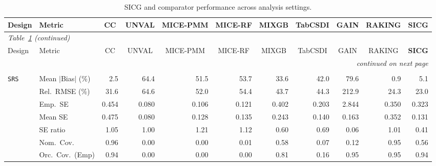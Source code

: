 \begin{landscape}
\footnotesize\setlength{\tabcolsep}{3.5pt}
\begin{longtable}{llrrrrrrrrr}
\caption{SICG and comparator performance across analysis settings.}
\label{tab:appc_nutri_Binomial} \\
\toprule
Design & Metric & \multicolumn{1}{c}{CC} & \multicolumn{1}{c}{UNVAL} & \multicolumn{1}{c}{MICE-PMM} & \multicolumn{1}{c}{MICE-RF} & \multicolumn{1}{c}{MIXGB} & \multicolumn{1}{c}{TabCSDI} & \multicolumn{1}{c}{GAIN} & \multicolumn{1}{c}{RAKING} & \multicolumn{1}{c}{\textbf{SICG}} \\
\midrule \endfirsthead
\multicolumn{11}{l}{\footnotesize\itshape Table~\ref{tab:appc_nutri_Binomial} (continued)} \\
\toprule
Design & Metric & \multicolumn{1}{c}{CC} & \multicolumn{1}{c}{UNVAL} & \multicolumn{1}{c}{MICE-PMM} & \multicolumn{1}{c}{MICE-RF} & \multicolumn{1}{c}{MIXGB} & \multicolumn{1}{c}{TabCSDI} & \multicolumn{1}{c}{GAIN} & \multicolumn{1}{c}{RAKING} & \multicolumn{1}{c}{\textbf{SICG}} \\
\midrule \endhead
\midrule \multicolumn{11}{r}{\footnotesize\itshape continued on next page} \\
\endfoot
\bottomrule \endlastfoot
\multicolumn{11}{l}{\textbf{Continuous Phase-Two Covariates}} \\
\addlinespace[2pt]
\quad \texttt{SRS} & Mean $|$Bias$|$ (\%) & \cellcolor{ranktwo}2.5 & 64.4 & 51.5 & 53.7 & 33.6 & 42.0 & 79.6 & \cellcolor{rankone}0.9 & \cellcolor{rankthree}5.1 \\
 & Rel.\ RMSE (\%) & \cellcolor{rankthree}31.6 & 64.6 & 52.0 & 54.4 & 43.7 & 44.3 & 212.9 & \cellcolor{ranktwo}24.3 & \cellcolor{rankone}23.0 \\
 & Emp.\ SE & 0.454 & 0.080 & 0.106 & 0.121 & 0.402 & 0.203 & 2.844 & 0.350 & 0.323 \\
 & Mean SE & 0.475 & 0.080 & 0.128 & 0.135 & 0.243 & 0.140 & 0.163 & 0.352 & 0.131 \\
 & SE ratio & \cellcolor{rankthree}1.05 & \cellcolor{rankone}1.00 & 1.21 & 1.12 & 0.60 & 0.69 & 0.06 & \cellcolor{ranktwo}1.01 & 0.41 \\
 & Nom.\ Cov. & \cellcolor{ranktwo}0.96 & 0.00 & 0.00 & 0.01 & \cellcolor{rankthree}0.58 & 0.07 & 0.12 & \cellcolor{rankone}0.95 & 0.56 \\
 & Orc.\ Cov.\ (Emp) & \cellcolor{ranktwo}0.94 & 0.00 & 0.00 & 0.00 & \cellcolor{rankthree}0.81 & 0.16 & \cellcolor{rankone}0.95 & \cellcolor{rankone}0.95 & \cellcolor{ranktwo}0.94 \\

\end{longtable}
\end{landscape}
